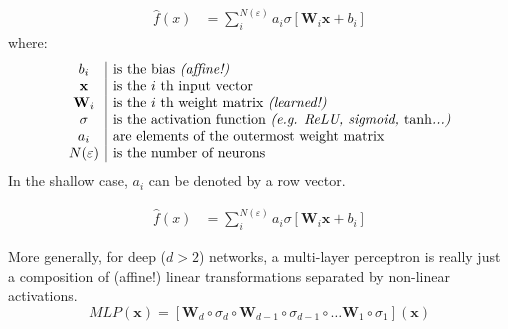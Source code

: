 \begin{frame}
    \begin{align*}
        \hat{f}(x) &=  \sum_i^{N(\varepsilon)} a_i \sigma \left[\mathbf{W}_i \mathbf{x} + b_i \right]
    \end{align*}
    where:
    \[
        \begin{array}{c|l}
            b_i & \text{is the bias \textit{(affine!)}} \\
            \mathbf{x} & \text{is the $i$ th input vector} \\
            \mathbf{W}_i & \text{is the $i$ th weight matrix \textit{(learned!)}} \\
            \sigma & \text{is the activation function \textit{(e.g. ReLU, sigmoid, $\tanh$...)}} \\
            a_i & \text{are elements of the outermost weight matrix} \\
            N(\varepsilon) & \text{is the number of neurons}
        \end{array}
    \]
    In the shallow case, $a_i$ can be denoted by a row vector.
\end{frame}
\begin{frame}
    \begin{align*}
        \hat{f}(x) &=  \sum_i^{N(\varepsilon)} a_i \sigma \left[\mathbf{W}_i \mathbf{x} + b_i \right]
    \end{align*}
\end{frame}
\begin{frame}
    More generally, for deep ($d > 2$) networks, a multi-layer perceptron is
    really just a composition of (affine!) linear transformations separated by non-linear
    activations.
    \[
        MLP(\mathbf{x}) = \left[
            \mathbf{W}_d \circ \sigma_d \circ
            \mathbf{W}_{d-1} \circ \sigma_{d-1} \circ
                \ldots
            \mathbf{W}_{1} \circ \sigma_{1} 
        \right] (\mathbf{x} )
    \]
\end{frame}


